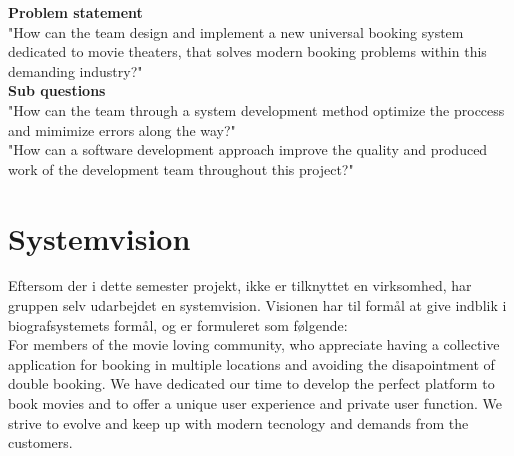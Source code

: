 \textbf{Problem statement} \\
"How can the team design and implement a new universal booking system dedicated to movie theaters, 
that solves modern booking problems within this demanding industry?" \\

\textbf{Sub questions} \\
"How can the team through a system development method optimize the proccess and mimimize errors along the way?" \\

"How can a software development approach improve the quality and produced work of the development team throughout this project?"

\section{Systemvision}
Eftersom der i dette semester projekt, ikke er tilknyttet en virksomhed, har gruppen selv udarbejdet en systemvision.
Visionen har til formål at give indblik i biografsystemets formål, og er formuleret som følgende:\\

For members of the movie loving community, who appreciate having a collective application for booking 
in multiple locations and avoiding the disapointment of double booking. We have dedicated our 
time to develop the perfect platform to book movies and to offer a unique user experience and private user function. 
We strive to evolve and keep up with modern tecnology and demands from the customers. \\



